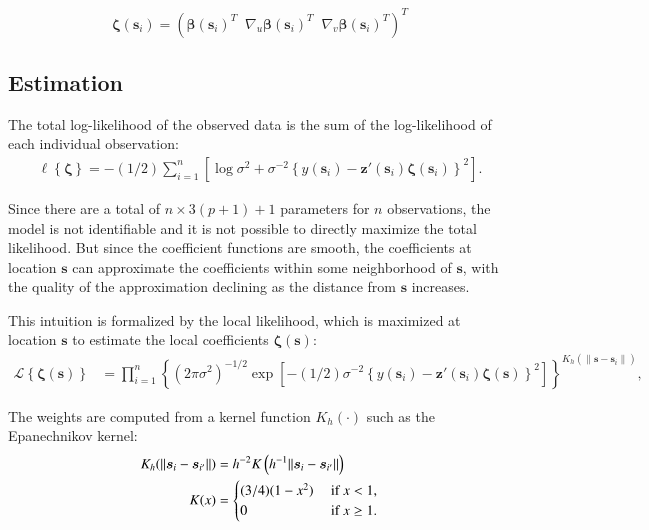 \documentclass[authoryear, review, 11pt]{elsarticle}
\begin{document}
    \begin{equation*}
        \bm{\zeta}(\bm{s}_i) = \left( \bm{\beta}(\bm{s}_i)^T \;\; \nabla_u \bm{\beta}(\bm{s}_i)^T \;\; \nabla_v \bm{\beta}(\bm{s}_i)^T \right)^T
    \end{equation*}
  
    \subsection{Estimation}		
    The total log-likelihood of the observed data is the sum of the log-likelihood of each individual observation:
    \begin{align} \label{eq:coefficients}
        \ell \left\{ \bm{\zeta} \right\} = -(1/2) \sum_{i=1}^n \left[ \log{ \sigma^2}  + \sigma^{-2}  \left\{ y(\bm{s}_i) - \bm{z}'(\bm{s}_i) \bm{\zeta}(\bm{s}_i) \right\}^2 \right].
	\end{align}
	
	Since there are a total of $n \times 3(p+1) + 1$ parameters for $n$ observations, the model is not identifiable and it is not possible to directly maximize the total likelihood. But since the coefficient functions are smooth, the coefficients at location $\bm{s}$ can approximate the coefficients within some neighborhood of $\bm{s}$, with the quality of the approximation declining as the distance from $\bm{s}$ increases.

    This intuition is formalized by the local likelihood, which is maximized at location $\bm{s}$ to estimate the local coefficients $\bm{\zeta}(\bm{s})$:
    \begin{align}\label{eq:local-likelihood}
		\mathcal{L} \left\{ \bm{\zeta}(\bm{s}) \right\} &= \prod_{i=1}^n \left\{ \left(2 \pi \sigma^2  \right)^{-1/2}  \exp \left[ -(1/2) \sigma^{-2}  \left\{ y(\bm{s}_i) - \bm{z}'(\bm{s}_i) \bm{\zeta}(\bm{s}) \right\}^2 \right] \right\} ^ {K_h( \| \bm{s} - \bm{s}_i \| )},
	\end{align}
 
    The weights are computed from a kernel function $K_h(\cdot)$ such as the Epanechnikov kernel:
    \begin{align}\label{eq:epanechnikov}
        K_h(\| \bm{s}_i - \bm{s}_{i'}\|) &= h^{-2} K\left( h^{-1} \| \bm{s}_i - \bm{s}_{i'}\| \right) \notag \\
        K(x) &= \begin{cases} (3/4) (1-x^2) &\mbox{ if } x < 1, \\ 0 &\mbox{ if } x \geq 1. \end{cases}
	\end{align}
  
\end{document}
